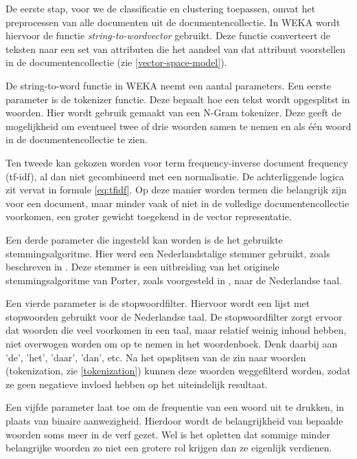 De eerste stap, voor we de classificatie en clustering toepassen, omvat het preprocessen van alle documenten uit de documentencollectie. In WEKA wordt hiervoor de functie \textit{string-to-wordvector} gebruikt. Deze functie converteert de teksten naar een set van attributen die het aandeel van dat attribuut voorstellen in de documentencollectie (zie \ref{vector-space-model}). 

De string-to-word functie in WEKA neemt een aantal parameters. Een eerste parameter is de tokenizer functie. Deze bepaalt hoe een tekst wordt opgesplitst in woorden. Hier wordt gebruik gemaakt van een N-Gram tokenizer. Deze geeft de mogelijkheid om eventueel twee of drie woorden samen te nemen en als \'e\'en woord in de documentencollectie te zien.

Ten tweede kan gekozen worden voor term frequency-inverse document frequency (tf-idf), al dan niet gecombineerd met een normalisatie. De achterliggende logica zit vervat in formule \ref{eq:tfidf}. Op deze manier worden termen die belangrijk zijn voor een document, maar minder vaak of niet in de volledige documentencollectie voorkomen, een groter gewicht toegekend in de vector representatie. 

Een derde parameter die ingesteld kan worden is de het gebruikte stemmingsalgoritme. Hier werd een Nederlandstalige stemmer gebruikt, zoals beschreven in \cite{Kraaij1994}. Deze stemmer is een uitbreiding van het originele stemmingsalgoritme van Porter, zoals voorgesteld in \cite{Porter1980}, naar de Nederlandse taal. 

Een vierde parameter is de stopwoordfilter. Hiervoor wordt een lijst met stopwoorden gebruikt voor de Nederlandse taal. De stopwoordfilter zorgt ervoor dat woorden die veel voorkomen in een taal, maar relatief weinig inhoud hebben, niet overwogen worden om op te nemen in het woordenboek. Denk daarbij aan 'de', 'het', 'daar', 'dan', etc. Na het opsplitsen van de zin naar woorden (tokenization, zie \ref{tokenization}) kunnen deze woorden weggefilterd worden, zodat ze geen negatieve invloed hebben op het uiteindelijk resultaat.

Een vijfde parameter laat toe om de frequentie van een woord uit te drukken, in plaats van binaire aanwezigheid. Hierdoor wordt de belangrijkheid van bepaalde woorden soms meer in de verf gezet. Wel is het opletten dat sommige minder belangrijke woorden zo niet een grotere rol krijgen dan ze eigenlijk verdienen.

